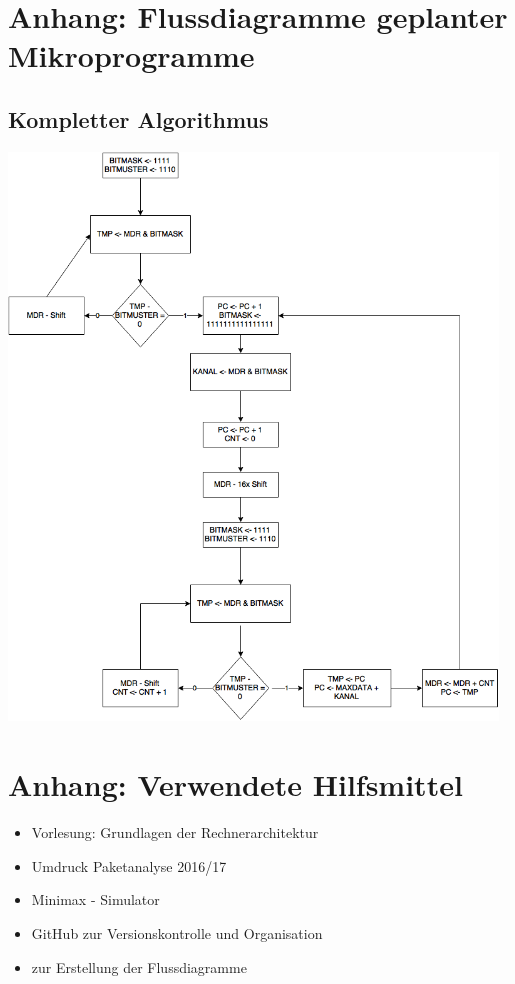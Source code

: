 \documentclass[12pt,titlepage,german,a4]{article}
\begin{document}
    \section{Anhang: Flussdiagramme geplanter Mikroprogramme}

	\subsection{Kompletter Algorithmus}

	\includegraphics[width=13cm]{algoComplete.png}


	\newpage
    \section{Anhang: Verwendete Hilfsmittel}
	\begin{itemize}
		\item Vorlesung: Grundlagen der Rechnerarchitektur
		\item Umdruck Paketanalyse 2016/17
		\item Minimax - Simulator
		\item GitHub zur Versionskontrolle und Organisation
		\item {} zur Erstellung der Flussdiagramme
	\end{itemize}
\end{document}
